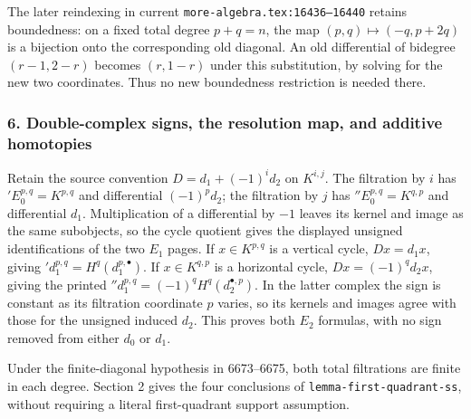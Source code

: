 \documentclass[11pt]{article}
\begin{document}
The later reindexing in current \texttt{more-algebra.tex:16436–16440} retains boundedness: on a fixed total degree \(p+q=n\), the map \((p,q)\mapsto(-q,p+2q)\) is a bijection onto the corresponding old diagonal. An old differential of bidegree \((r-1,2-r)\) becomes \((r,1-r)\) under this substitution, by solving for the new two coordinates. Thus no new boundedness restriction is needed there.

\subsubsection{6. Double-complex signs, the resolution map, and additive homotopies}\label{double-complex-signs-the-resolution-map-and-additive-homotopies}

Retain the source convention \(D=d_1+(-1)^i d_2\) on \(K^{i,j}\). The filtration by \(i\) has \({}'E_0^{p,q}=K^{p,q}\) and differential \((-1)^pd_2\); the filtration by \(j\) has \({}''E_0^{p,q}=K^{q,p}\) and differential \(d_1\). Multiplication of a differential by \(-1\) leaves its kernel and image as the same subobjects, so the cycle quotient gives the displayed unsigned identifications of the two \(E_1\) pages. If \(x\in K^{p,q}\) is a vertical cycle, \(Dx=d_1x\), giving \({}'d_1^{p,q}=H^q(d_1^{p,\bullet})\). If \(x\in K^{q,p}\) is a horizontal cycle, \(Dx=(-1)^qd_2x\), giving the printed \({}''d_1^{p,q}=(-1)^qH^q(d_2^{\bullet,p})\). In the latter complex the sign is constant as its filtration coordinate \(p\) varies, so its kernels and images agree with those for the unsigned induced \(d_2\). This proves both \(E_2\) formulas, with no sign removed from either \(d_0\) or \(d_1\).

Under the finite-diagonal hypothesis in 6673--6675, both total filtrations are finite in each degree. Section 2 gives the four conclusions of \texttt{lemma-first-quadrant-ss}, without requiring a literal first-quadrant support assumption.
\end{document}

